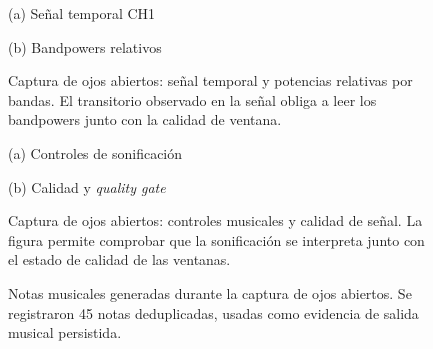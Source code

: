 \documentclass[../main.tex]{subfiles}
\begin{document}
\begin{figure}[htbp]
    \centering
    \begin{minipage}{0.49\textwidth}
        \centering
        \small (a) Señal temporal CH1
    \end{minipage}
    \hfill
    \begin{minipage}{0.49\textwidth}
        \centering
        \small (b) Bandpowers relativos
    \end{minipage}
    \caption{Captura de ojos abiertos: señal temporal y potencias relativas por bandas. El transitorio observado en la señal obliga a leer los bandpowers junto con la calidad de ventana.}
    \label{fig:validacion_s01_01_eeg_bands}
\end{figure}

\begin{figure}[htbp]
    \centering
    \begin{minipage}{0.49\textwidth}
        \centering
        \small (a) Controles de sonificación
    \end{minipage}
    \hfill
    \begin{minipage}{0.49\textwidth}
        \centering
        \small (b) Calidad y \textit{quality gate}
    \end{minipage}
    \caption{Captura de ojos abiertos: controles musicales y calidad de señal. La figura permite comprobar que la sonificación se interpreta junto con el estado de calidad de las ventanas.}
    \label{fig:validacion_s01_01_controls_quality}
\end{figure}

\begin{figure}[htbp]
    \centering
    \caption{Notas musicales generadas durante la captura de ojos abiertos. Se registraron 45 notas deduplicadas, usadas como evidencia de salida musical persistida.}
    \label{fig:validacion_s01_01_notes}
\end{figure}
\end{document}
